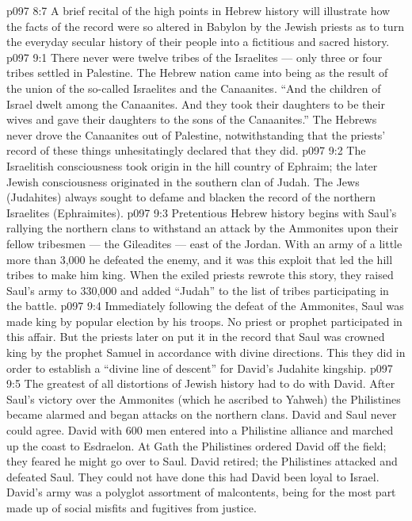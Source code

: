 \vs p097 8:7 \pc A brief recital of the high points in Hebrew history will illustrate how the facts of the record were so altered in Babylon by the Jewish priests as to turn the everyday secular history of their people into a fictitious and sacred history.
\vs p097 9:1 There never were twelve tribes of the Israelites --- only three or four tribes settled in Palestine. The Hebrew nation came into being as the result of the union of the so\hyp{}called Israelites and the Canaanites. “And the children of Israel dwelt among the Canaanites. And they took their daughters to be their wives and gave their daughters to the sons of the Canaanites.” The Hebrews never drove the Canaanites out of Palestine, notwithstanding that the priests’ record of these things unhesitatingly declared that they did.
\vs p097 9:2 The Israelitish consciousness took origin in the hill country of Ephraim; the later Jewish consciousness originated in the southern clan of Judah. The Jews (Judahites) always sought to defame and blacken the record of the northern Israelites (Ephraimites).
\vs p097 9:3 \pc Pretentious Hebrew history begins with Saul’s rallying the northern clans to withstand an attack by the Ammonites upon their fellow tribesmen --- the Gileadites --- east of the Jordan. With an army of a little more than 3,000 he defeated the enemy, and it was this exploit that led the hill tribes to make him king. When the exiled priests rewrote this story, they raised Saul’s army to 330,000 and added “Judah” to the list of tribes participating in the battle.
\vs p097 9:4 Immediately following the defeat of the Ammonites, Saul was made king by popular election by his troops. No priest or prophet participated in this affair. But the priests later on put it in the record that Saul was crowned king by the prophet Samuel in accordance with divine directions. This they did in order to establish a “divine line of descent” for David’s Judahite kingship.
\vs p097 9:5 The greatest of all distortions of Jewish history had to do with David. After Saul’s victory over the Ammonites (which he ascribed to Yahweh) the Philistines became alarmed and began attacks on the northern clans. David and Saul never could agree. David with 600 men entered into a Philistine alliance and marched up the coast to Esdraelon. At Gath the Philistines ordered David off the field; they feared he might go over to Saul. David retired; the Philistines attacked and defeated Saul. They could not have done this had David been loyal to Israel. David’s army was a polyglot assortment of malcontents, being for the most part made up of social misfits and fugitives from justice.
